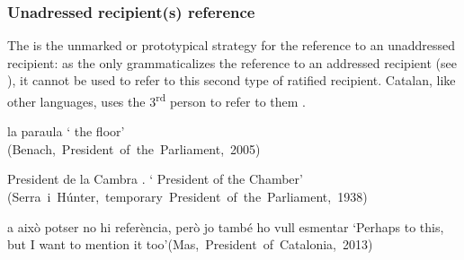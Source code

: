 \documentclass[output=paper]{langscibook}
\begin{document}
\subsubsection{Unadressed recipient(s) reference}\label{sec:nogue:2.2.2}
\label{sec:nogue:2.2.2.1}

The  is the unmarked or prototypical strategy for the reference to an unaddressed recipient: as the  only grammaticalizes the reference to an addressed recipient (see ), it cannot be used to refer to this second type of ratified recipient. Catalan, like other languages, uses the 3\textsuperscript{rd} person to refer to them .\largerpage



\ea\label{ex:nogue:32}
 \ea\label{ex:nogue:32a}
 { {la paraula} }
\glt `       the floor'\\
\hfill\hbox{(Benach, President of the Parliament, 2005)}

\ex\label{ex:nogue:32b}
{ {President de la Cambra} .}
\glt `            President of the Chamber'\\
\hfill\hbox{(Serra i Húnter, temporary President of the Parliament, 1938)}

\ex\label{ex:nogue:32c}
{{a això}  {potser no hi}  {referència, però jo també ho vull esmentar}}
\glt `Perhaps      to this, but I want to mention it too'\hfill\hbox{(Mas, President of Catalonia, 2013)}
\z\z 
\end{document}
